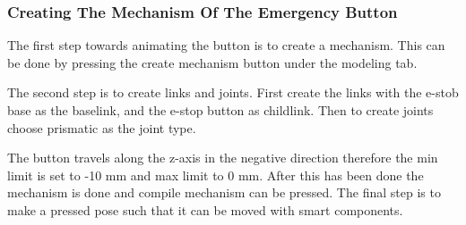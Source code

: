 \documentclass[a4paper,12pt]{article}
\begin{document}
\subsubsection{Creating The Mechanism Of The Emergency Button}

The first step towards animating the button is to create a mechanism. This can be done by pressing the create mechanism button under the modeling tab.

The second step is to create links and joints. First create the links with the e-stob base as the baselink, and the e-stop button as childlink. Then to create joints choose prismatic as the joint type.

The button travels along the z-axis in the negative direction therefore the min limit is set to -10 mm and max limit to 0 mm. After this has been done the mechanism is done and compile mechanism can be pressed. The final step is to make a pressed pose such that it can be moved with smart components.
\end{document}
